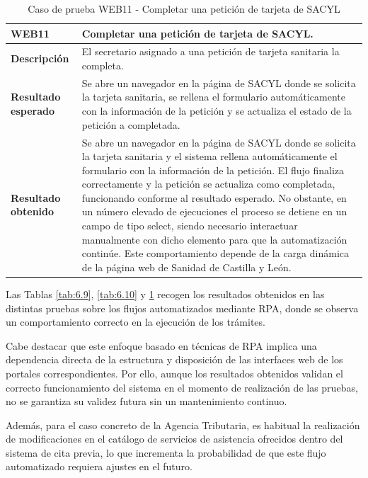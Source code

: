     \begin{table}[H]
        \centering
        \begin{tabular}{|l|p{12cm}|}
        \hline
        \textbf{WEB11} & Completar una petición de tarjeta de SACYL. \\ \hline
        \textbf{Descripción} & El secretario asignado a una petición de tarjeta sanitaria la completa. \\ \hline
        \textbf{Resultado esperado} & Se abre un navegador en la página de SACYL donde se solicita la tarjeta sanitaria, se rellena el formulario automáticamente con la información de la petición y se actualiza el estado de la petición a completada. \\ \hline
        \textbf{Resultado obtenido} & Se abre un navegador en la página de SACYL donde se solicita la tarjeta sanitaria y el sistema rellena automáticamente el formulario con la información de la petición. 
            El flujo finaliza correctamente y la petición se actualiza como completada, funcionando conforme al resultado esperado. 
            No obstante, en un número elevado de ejecuciones el proceso se detiene en un campo de tipo select, siendo necesario interactuar manualmente con dicho elemento para que la automatización continúe. 
            Este comportamiento depende de la carga dinámica de la página web de Sanidad de Castilla y León. \\ \hline
        \end{tabular}
        \caption{Caso de prueba WEB11 - Completar una petición de tarjeta de SACYL}
        \label{tab:6.11}
    \end{table}

    Las Tablas \ref{tab:6.9}, \ref{tab:6.10} y \ref{tab:6.11} recogen los resultados obtenidos en las distintas pruebas sobre los flujos automatizados mediante RPA, donde se observa un comportamiento correcto en la ejecución de los trámites. 
    
    Cabe destacar que este enfoque basado en técnicas de RPA implica una dependencia directa de la estructura y disposición de las interfaces web de los portales correspondientes. 
    Por ello, aunque los resultados obtenidos validan el correcto funcionamiento del sistema en el momento de realización de las pruebas, no se garantiza su validez futura sin un mantenimiento continuo. 
    
    Además, para el caso concreto de la Agencia Tributaria, es habitual la realización de modificaciones en el catálogo de servicios de asistencia ofrecidos dentro del sistema de cita previa, lo que incrementa la probabilidad de que este flujo automatizado requiera ajustes en el futuro. 

